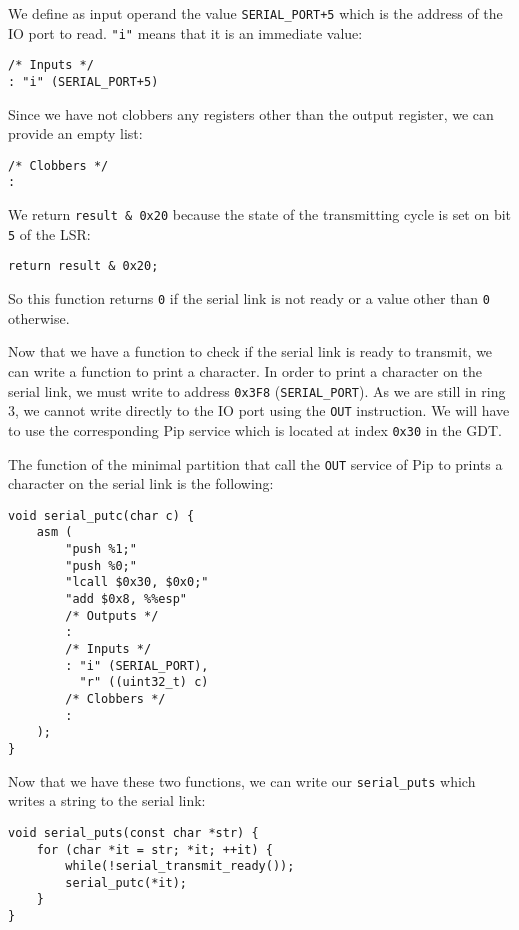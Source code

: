 \documentclass[10pt,a4paper,titlepage]{refart}
\begin{document}
We define as input operand the value \texttt{SERIAL\_PORT+5} which is the
address of the IO port to read. \texttt{"i"} means that it is an immediate
value:

\begin{lstlisting}[style=CStyle]
/* Inputs */
: "i" (SERIAL_PORT+5)
\end{lstlisting}

Since we have not clobbers any registers other than the output register, we can
provide an empty list:

\begin{lstlisting}[style=CStyle]
/* Clobbers */
:
\end{lstlisting}

We return \texttt{result \& 0x20} because the state of the transmitting cycle is
set on bit \texttt{5} of the LSR:

\begin{lstlisting}[style=CStyle]
return result & 0x20;
\end{lstlisting}

So this function returns \texttt{0} if the serial link is not ready or a value
other than \texttt{0} otherwise.

Now that we have a function to check if the serial link is ready to transmit, we
can write a function to print a character. In order to print a character on the
serial link, we must write to address \texttt{0x3F8} (\texttt{SERIAL\_PORT}). As
we are still in ring 3, we cannot write directly to the IO port using the
\texttt{OUT} instruction. We will have to use the corresponding Pip service
which is located at index \texttt{0x30} in the GDT.

The function of the minimal partition that call the \texttt{OUT} service of Pip
to prints a character on the serial link is the following:

\begin{lstlisting}[style=CStyle]
void serial_putc(char c) {
    asm (
        "push %1;"
        "push %0;"
        "lcall $0x30, $0x0;"
        "add $0x8, %%esp"
        /* Outputs */
        :
        /* Inputs */
        : "i" (SERIAL_PORT),
          "r" ((uint32_t) c)
        /* Clobbers */
        :
    );
}
\end{lstlisting}

Now that we have these two functions, we can write our \texttt{serial\_puts}
which writes a string to the serial link:

\begin{lstlisting}[style=CStyle]
void serial_puts(const char *str) {
    for (char *it = str; *it; ++it) {
        while(!serial_transmit_ready());
        serial_putc(*it);
    }
}
\end{lstlisting}
\end{document}
